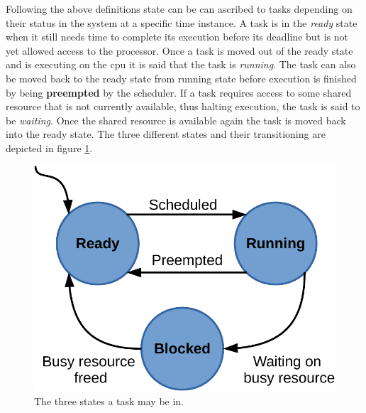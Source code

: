 \documentclass{kththesis}
\begin{document}
Following the above definitions state can be can ascribed to tasks depending on their status in the
system at a specific time instance. A task is in the \textit{ready} state when it still needs time
to complete its execution before its deadline but is not yet allowed access to the processor. Once a
task is moved out of the ready state and is executing on the \acrshort{cpu} it is said that the task
is \textit{running}. The task can also be moved back to the ready state from running state before
execution is finished by being \textbf{preempted} by the scheduler. If a task requires access to
some shared resource that is not currently available, thus halting execution, the task is said to be
\textit{waiting}. Once the shared resource is available again the task is moved back into the ready
state. The three different states and their transitioning are depicted in figure
\ref{fig:ready_running_blocked_model}.

\begin{figure}

    \centering

    \includegraphics[width=0.7\linewidth]{images/ready-running-blocked-model.pdf}

    \caption{The three states a task may be in.}

    \label{fig:ready_running_blocked_model}

\end{figure}
\end{document}
